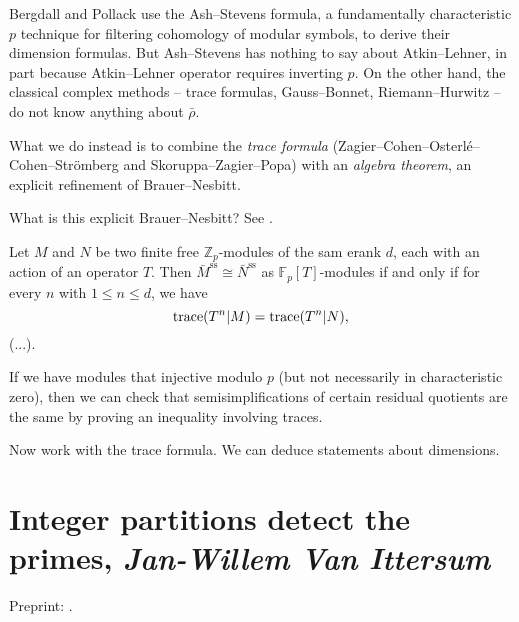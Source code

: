 \documentclass[reqno]{amsart} 
\begin{document}
Bergdall and Pollack use the Ash--Stevens formula, a fundamentally characteristic $p$ technique for filtering cohomology of modular symbols, to derive their dimension formulas.  But Ash--Stevens has nothing to say about Atkin--Lehner, in part because Atkin--Lehner operator requires inverting $p$.  On the other hand, the classical complex methods -- trace formulas, Gauss--Bonnet, Riemann--Hurwitz -- do not know anything about $\bar{\rho}$.

What we do instead is to combine the \emph{trace formula} (Zagier--Cohen--Osterl{\'e}--Cohen--Str{\"o}mberg and Skoruppa--Zagier--Popa) with an \emph{algebra theorem}, an explicit refinement of Brauer--Nesbitt.

What is this explicit Brauer--Nesbitt?  See \cite{2022arXiv2207.07108}.
\begin{theorem}[AGM]
  Let $M$ and $N$ be two finite free $\mathbb{Z}_p$-modules of the sam erank $d$, each with an action of an operator $T$.  Then $\bar{M}^{\mathrm{ss}} \cong \bar{N}^{\mathrm{ss}}$ as $\mathbb{F}_p[T]$-modules if and only if for every $n$ with $1 \leq n \leq d$, we have
  \begin{equation*}
    \operatorname{trace}(T^n | M) = \operatorname{trace}(T^n | N),
  \end{equation*}
  (...).
\end{theorem}
\begin{corollary}
  If we have modules that injective modulo $p$ (but not necessarily in characteristic zero), then we can check that semisimplifications of certain residual quotients are the same by proving an inequality involving traces.
\end{corollary}

Now work with the trace formula.  We can deduce statements about dimensions.

\section{Integer partitions detect the primes, \textnormal{\emph{Jan-Willem Van Ittersum}}}
Preprint: \cite{2024arXiv2405.06451}.
\end{document}
